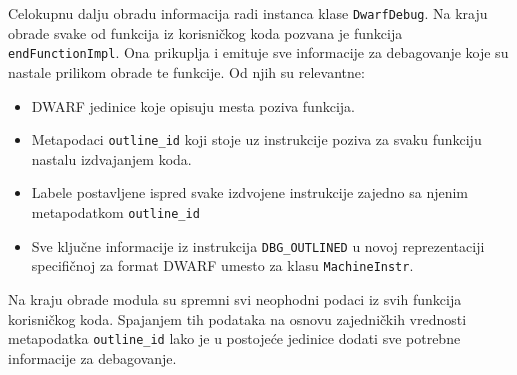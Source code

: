 \documentclass[12pt,oneside]{memoir}
\begin{document}
Celokupnu dalju obradu informacija radi instanca klase \verb|DwarfDebug|.
Na kraju obrade svake od funkcija iz korisničkog koda pozvana je funkcija \verb|endFunctionImpl|.
Ona prikuplja i emituje sve informacije za debagovanje koje su nastale prilikom obrade te funkcije.
Od njih su relevantne:
\begin{itemize}
  \item DWARF jedinice koje opisuju mesta poziva funkcija.
  \item Metapodaci \verb|outline_id| koji stoje uz instrukcije poziva za svaku funkciju nastalu izdvajanjem koda.
  \item Labele postavljene ispred svake izdvojene instrukcije zajedno sa njenim metapodatkom \verb|outline_id|
  \item Sve ključne informacije iz instrukcija \verb|DBG_OUTLINED| u novoj reprezentaciji specifičnoj za format DWARF umesto za klasu \verb|MachineInstr|.
\end{itemize}
Na kraju obrade modula su spremni svi neophodni podaci iz svih funkcija korisničkog koda.
Spajanjem tih podataka na osnovu zajedničkih vrednosti metapodatka \verb|outline_id| lako je u postojeće jedinice dodati sve potrebne informacije za debagovanje.

\end{document}
